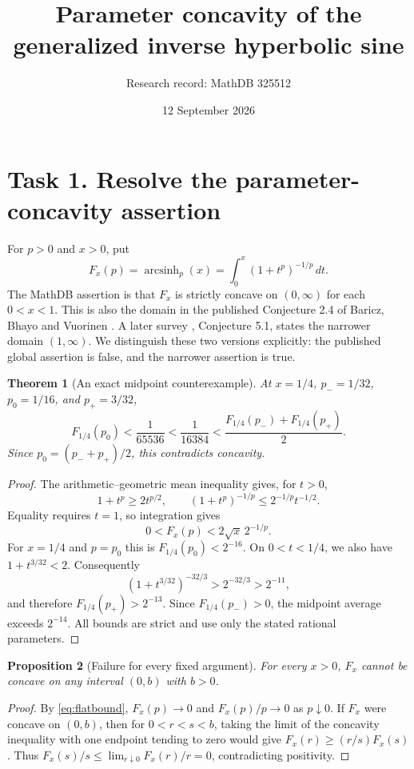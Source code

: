 \documentclass[11pt]{article}
\title{Parameter concavity of the generalized inverse hyperbolic sine}
\author{Research record: MathDB 325512}
\date{12 September 2026}
\newtheorem{theorem}{Theorem}
\newtheorem{proposition}[theorem]{Proposition}
\begin{document}
\maketitle

\section*{Task 1. Resolve the parameter-concavity assertion}
For $p>0$ and $x>0$, put
\[
 F_x(p)=\operatorname{arcsinh}_p(x)
       =\int_0^x(1+t^p)^{-1/p}\,dt.
\]
The MathDB assertion is that $F_x$ is strictly concave on $(0,\infty)$
for each $0<x<1$. This is also the domain in the published
Conjecture 2.4 of Baricz, Bhayo and Vuorinen \cite{BBV}.
A later survey \cite{survey}, Conjecture 5.1, states the narrower
domain $(1,\infty)$. We distinguish these two versions explicitly:
the published global assertion is false, and the narrower assertion
is true.

\begin{theorem}[An exact midpoint counterexample]\label{thm:counter}
At $x=1/4$, $p_-=1/32$, $p_0=1/16$, and $p_+=3/32$,
\[
 F_{1/4}(p_0)<\frac1{65536}
 <\frac1{16384}
 <\frac{F_{1/4}(p_-)+F_{1/4}(p_+)}2.
\]
Since $p_0=(p_-+p_+)/2$, this contradicts concavity.
\end{theorem}
\begin{proof}
The arithmetic--geometric mean inequality gives, for $t>0$,
\[
 1+t^p\ge2t^{p/2},\qquad
 (1+t^p)^{-1/p}\le 2^{-1/p}t^{-1/2}.
\]
Equality requires $t=1$, so integration gives
\begin{equation}\label{eq:flatbound}
 0<F_x(p)<2\sqrt{x}\,2^{-1/p}.
\end{equation}
For $x=1/4$ and $p=p_0$ this is $F_{1/4}(p_0)<2^{-16}$.
On $0<t<1/4$, we also have $1+t^{3/32}<2$. Consequently
\[
 (1+t^{3/32})^{-32/3}
 >2^{-32/3}>2^{-11},
\]
and therefore $F_{1/4}(p_+)>2^{-13}$.
Since $F_{1/4}(p_-)>0$, the midpoint average exceeds $2^{-14}$.
All bounds are strict and use only the stated rational parameters.
\end{proof}

\begin{proposition}[Failure for every fixed argument]
For every $x>0$, $F_x$ cannot be concave on any interval $(0,b)$
with $b>0$.
\end{proposition}
\begin{proof}
By \eqref{eq:flatbound}, $F_x(p)\to0$ and $F_x(p)/p\to0$ as
$p\downarrow0$. If $F_x$ were concave on $(0,b)$, then for
$0<r<s<b$, taking the limit of the concavity inequality with
one endpoint tending to zero would give
$F_x(r)\ge(r/s)F_x(s)$. Thus
$F_x(s)/s\le\lim_{r\downarrow0}F_x(r)/r=0$, contradicting positivity.
\end{proof}
\end{document}
